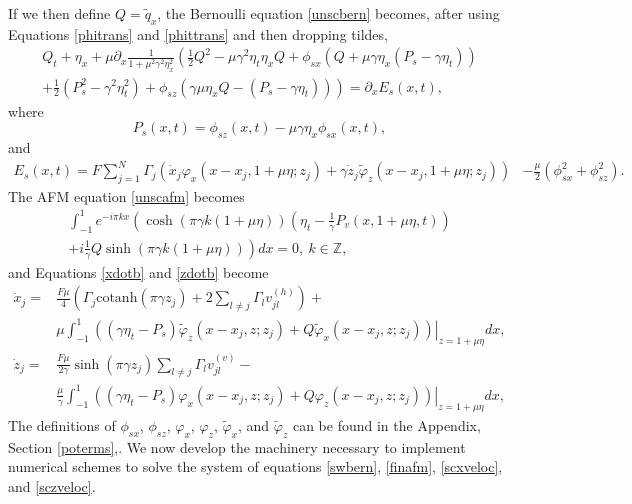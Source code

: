 \documentclass[a4paper,11pt]{article}
\newcommand{\p}{\partial}
\begin{document}
If we then define $Q = \tilde{q}_{x}$, the Bernoulli equation \eqref{unscbern} becomes, after using Equations \eqref{phitrans} and \eqref{phittrans} and then dropping tildes,  
\begin{multline}
Q_{t} + \eta_{x} + \mu\p_{x}\frac{1}{1+ \mu^{2}\gamma^{2}\eta_{x}^{2}} \left( \frac{1}{2}Q^{2} - \mu \gamma^{2}\eta_{t}\eta_{x}Q  +  \phi_{sx} (Q + \mu\gamma\eta_{x}( P_{s}-\gamma\eta_{t}))   \right. \\
\left. + \frac{1}{2}\left(P_{s}^{2}-\gamma^{2}\eta_{t}^{2} \right)+ \phi_{sz}\left(\gamma \mu \eta_{x}Q-\left(P_{s}-\gamma \eta_{t}\right) \right) \right)= \p_{x}E_{s}(x,t), \label{swbern}
\end{multline}
where 
\[
P_{s}(x,t) = \phi_{sz}(x,t)-\mu\gamma \eta_{x}\phi_{sx}(x,t),
\]
and
\begin{align*}
E_{s}(x,t) =  F\sum_{j=1}^{N}\Gamma_{j}\left(\dot{x}_{j}\varphi_{x}(x-x_{j},1+\mu\eta;z_{j}) + \gamma\dot{z}_{j}\tilde{\varphi}_{z}(x-x_{j},1+\mu\eta;z_{j}) \right)
& -\frac{\mu}{2}\left(\phi_{sx}^{2} + \phi_{sz}^{2}\right).
\end{align*}
The AFM equation \eqref{unscafm} becomes  
\begin{multline}
\int_{-1}^{1} e^{-i\pi k x}\left(\cosh\left( \pi\gamma k (1 + \mu \eta)\right)\left(\eta_{t} - \frac{1}{\gamma}P_{v}(x,1+\mu\eta,t) \right) \right.\\
\left.+i  \frac{1}{\gamma}Q\sinh\left(\pi \gamma k (1 + \mu \eta)\right)\right) dx = 0,~k\in\mathbb{Z},\label{finafm}
\end{multline}
and Equations \eqref{xdotb} and \eqref{zdotb} become
\begin{align}
\dot{x}_{j} = &\frac{F\mu}{4}\left(\Gamma_{j}\mbox{cotanh}\left(\pi \gamma z_{j} \right)+2\sum_{l\neq j}\Gamma_{l}v_{jl}^{(h)} \right)+\label{scxveloc}\\
& \mu \int_{-1}^{1} \left.\left( \left(\gamma \eta_{t}-P_{s} \right) \tilde{\varphi}_{z}(x-x_{j},z;z_{j}) +  Q \tilde{\varphi}_{x}(x-x_{j},z;z_{j}) \right)\right|_{z=1+\mu\eta} dx, \nonumber\\
\dot{z}_{j} = & \frac{F\mu}{2\gamma}\sinh\left( \pi \gamma z_{j}\right)\sum_{l\neq j} \Gamma_{l} v_{jl}^{(v)}-\label{sczveloc}\\
&  \frac{\mu}{\gamma }\int_{-1}^{1} \left.\left(\left(\gamma \eta_{t}-P_{s}\right) \varphi_{x}(x-x_{j},z;z_{j}) + Q \varphi_{z}(x-x_{j},z;z_{j}) \right)\right|_{z=1+\mu\eta}dx, \nonumber
\end{align}
The definitions of $\phi_{sx}$, $\phi_{sz}$, $\varphi_{x}$, $\varphi_{z}$, $\tilde{\varphi}_{x}$, and $\tilde{\varphi}_{z}$ can be found in the Appendix, Section \ref{poterms},.  We now develop the machinery necessary to implement numerical schemes to solve the system of equations \eqref{swbern}, \eqref{finafm}, \eqref{scxveloc}, and \eqref{sczveloc}.  
\end{document}
